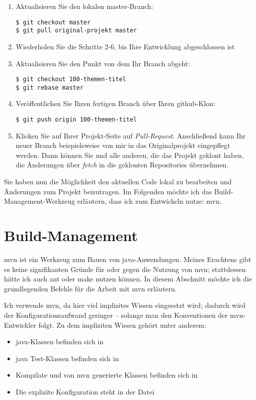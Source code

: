\begin{enumerate}
\item Aktualisieren Sie den lokalen master-Branch:
\begin{verbatim}
$ git checkout master
$ git pull original-projekt master
\end{verbatim}

\item Wiederholen Sie die Schritte 2-6, bis Ihre Entwicklung abgeschlossen ist

\item Aktualisieren Sie den Punkt von dem Ihr Branch abgeht:
\begin{verbatim}
$ git checkout 100-themen-titel
$ git rebase master
\end{verbatim}

\item Veröffentlichen Sie Ihren fertigen Branch über Ihren github-Klon:
\begin{verbatim}
$ git push origin 100-themen-titel
\end{verbatim}

\item Klicken Sie auf Ihrer Projekt-Seite auf \emph{Pull-Request}. Anschließend kann Ihr neuer Branch beispielsweise von mir in das Originalprojekt eingepflegt werden. Dann können Sie und alle anderen, die das Projekt geklont haben, die Änderungen über \emph{fetch} in die geklonten Repositories übernehmen.
\end{enumerate}

Sie haben nun die Möglichkeit den aktuellen Code lokal zu bearbeiten und Änderungen zum Projekt beizutragen. Im Folgenden möchte ich das Build-Management-Werkzeug erläutern, dass ich zum Entwickeln nutze: \gls{mvn}.

\section{Build-Management}
\gls{mvn} ist ein Werkzeug zum Bauen von \gls{java}-Anwendungen. Meines Erachtens gibt es keine signifikanten Gründe für oder gegen die Nutzung von \gls{mvn}; stattdessen hätte ich auch \gls{ant} oder \gls{make} nutzen können. In diesem Abschnitt möchte ich die grundlegenden Befehle für die Arbeit mit \gls{mvn} erläutern.

Ich verwende \gls{mvn}, da hier viel implizites Wissen eingesetzt wird; dadurch wird der Konfigurationsaufwand geringer -- solange man den Konventionen der \gls{mvn}-Entwickler folgt. Zu dem impliziten Wissen gehört unter anderem:
\begin{itemize}
\item \gls{java}-Klassen befinden sich in 
\item \gls{java} Test-Klassen befinden sich in 
\item Kompilate und von \gls{mvn} generierte Klassen befinden sich in 
\item Die explizite Konfiguration steht in der Datei 
\end{itemize}


